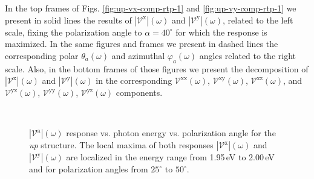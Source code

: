 \documentclass[prb,11pt,tightenlines,twocolumn,aps]{revtex4-1}
\begin{document}
In the top frames of  Figs. \ref{fig:up-vx-comp-rtp-1} and 
% 
\ref{fig:up-vy-comp-rtp-1} we present in solid lines the results of
$|\mathcal{V}^{\mathrm{x}}|(\omega)$ and $|\mathcal{V}^{\mathrm{y}}|(\omega)$,
related to the left scale, fixing the polarization angle to $\alpha=40^{\circ}$
for which the response is maximized. In the same
figures and frames we present in dashed lines the corresponding polar
$\theta_{a}(\omega)$ and azimuthal $\varphi_{a}(\omega)$ angles related to the
right scale. Also, in the bottom frames of those figures we present the
decomposition of $|\mathcal{V}^{\mathrm{x}}|(\omega)$ and
$|\mathcal{V}^{\mathrm{y}}|(\omega)$ in the corresponding
$\mathcal{V}^{\mathrm{xx}}(\omega)$, $\mathcal{V}^{\mathrm{xy}}(\omega)$,
$\mathcal{V}^{\mathrm{xz}}(\omega)$, and $\mathcal{V}^{\mathrm{yx}}(\omega)$,
$\mathcal{V}^{\mathrm{yy}}(\omega)$, $\mathcal{V}^{\mathrm{yz}}(\omega)$
components.
\begin{figure}[t]
    \centering
    \\
    
    \caption{$|\mathcal{V}^{\mathrm{a}}|(\omega)$ response vs. photon energy vs.
    polarization angle for the \emph{up} structure. The local maxima of both
    responses $|\mathcal{V}^{\mathrm{x}}|(\omega)$ and
    $|\mathcal{V}^{\mathrm{y}}|(\omega)$ are localized in the energy range from
    1.95\,eV to 2.00\,eV and for polarization angles from $25^{\circ}$ to
    $50^{\circ}$.}
    \label{fig:up-3d-vva-2}
\end{figure}
\end{document}
